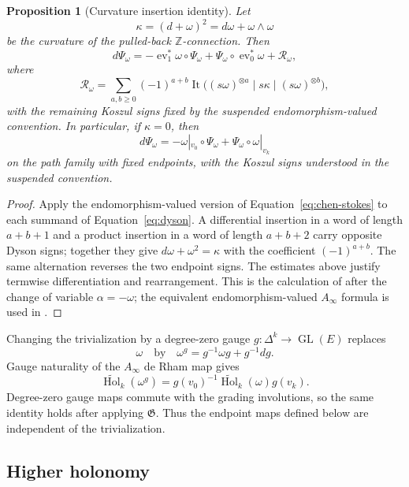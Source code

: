 \documentclass[12pt]{amsart}
\newtheorem{prop}[thm]{Proposition}
\theoremstyle{definition}
\theoremstyle{remark}
\numberwithin{equation}{section}
\newcommand{\Z}{{\mathbb{Z}}}
\newcommand{\1}{{\mathbb{1}}}
\newcommand{\GL}{\operatorname{GL}}
\newcommand{\ev}{\operatorname{ev}}
\begin{document}
\begin{prop}[Curvature insertion identity]\label{prop:curvature}
Let
\[
 \kappa=(d+\omega)^2=d\omega+\omega\wedge\omega
\]
be the curvature of the pulled-back $\Z$-connection.  Then
\begin{equation}\label{eq:curvature-insertion}
 d\Psi_\omega
 =
 -\ev_1^*\omega\circ\Psi_\omega
 +\Psi_\omega\circ\ev_0^*\omega
 +\mathcal R_\omega,
\end{equation}
where
\[
 \mathcal R_\omega
 =
 \sum_{a,b\geq0}(-1)^{a+b}
 \operatorname{It}
 \bigl(
  (s\omega)^{\otimes a}\mid
  s\kappa\mid
  (s\omega)^{\otimes b}
 \bigr),
\]
with the remaining Koszul signs fixed by the suspended
endomorphism-valued convention.  In particular, if $\kappa=0$, then
\[
 d\Psi_\omega
 =
 -\omega|_{v_0}\circ\Psi_\omega
 +\Psi_\omega\circ\omega|_{v_k}
\]
on the path family with fixed endpoints, with the Koszul signs
understood in the suspended convention.
\end{prop}

\begin{proof}
Apply the endomorphism-valued version of
Equation~\eqref{eq:chen-stokes} to each summand of
Equation~\eqref{eq:dyson}.  A differential insertion in a word of
length $a+b+1$ and a product insertion in a word of length $a+b+2$
carry opposite Dyson signs; together they give
$d\omega+\omega^2=\kappa$ with the coefficient $(-1)^{a+b}$.
The same alternation reverses the two endpoint signs.  The estimates
above justify termwise differentiation and rearrangement.  This is
the calculation of \cite[Section 3.4]{BS14} after the change of
variable $\alpha=-\omega$; the equivalent endomorphism-valued
$A_\infty$ formula is used in \cite[Sections 4.1--4.3]{AS12}.
\end{proof}

Changing the trivialization by a degree-zero gauge
$g:\Delta^k\to\GL(E)$ replaces
\[
 \omega\quad\text{by}\quad
 \omega^g=g^{-1}\omega g+g^{-1}dg.
\]
Gauge naturality of the $A_\infty$ de Rham map
\cite[Section 4.1 and Proposition 4.4]{AS12} gives
\begin{equation}\label{eq:gauge-holonomy}
 \widetilde{\operatorname{Hol}}_k(\omega^g)
 =
 g(v_0)^{-1}\widetilde{\operatorname{Hol}}_k(\omega)g(v_k).
\end{equation}
Degree-zero gauge maps commute with the grading involutions, so the
same identity holds after applying $\mathfrak G$.  Thus the endpoint
maps defined below are independent of the trivialization.

\subsection{Higher holonomy}
\end{document}
